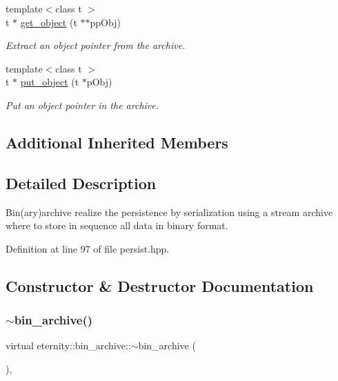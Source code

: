 \begin{DoxyCompactItemize}
{\footnotesize template$<$class t $>$ }\\t $\ast$ \hyperlink{classeternity_1_1bin__archive_a4c9b0ab9146c3a9ccaa5ec745299b282}{get\+\_\+object} (t $\ast$$\ast$pp\+Obj)
\begin{DoxyCompactList}\small\item\em Extract an object pointer from the archive. \end{DoxyCompactList}\item 
{\footnotesize template$<$class t $>$ }\\t $\ast$ \hyperlink{classeternity_1_1bin__archive_ab93c74313a8c6afdc65d4f2f2860502c}{put\+\_\+object} (t $\ast$p\+Obj)
\begin{DoxyCompactList}\small\item\em Put an object pointer in the archive. \end{DoxyCompactList}\end{DoxyCompactItemize}
\subsection*{Additional Inherited Members}


\subsection{Detailed Description}
Bin(ary)archive realize the persistence by serialization using a stream archive where to store in sequence all data in binary format. 

Definition at line 97 of file persist.\+hpp.



\subsection{Constructor \& Destructor Documentation}
\mbox{\label{classeternity_1_1bin__archive_a0cc44edd050d598ff4f617e445159386}} 
\subsubsection{\texorpdfstring{$\sim$bin\+\_\+archive()}{~bin\_archive()}}
{\footnotesize\ttfamily virtual eternity\+::bin\+\_\+archive\+::$\sim$bin\+\_\+archive (\begin{DoxyParamCaption}{ }\end{DoxyParamCaption})\hspace{0.3cm}{\ttfamily [inline]}, {\ttfamily [virtual]}}



